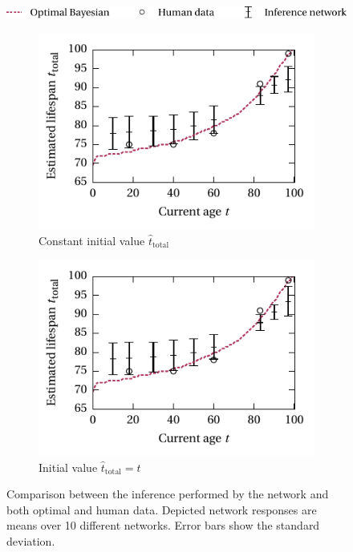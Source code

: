 \documentclass[a4paper,11pt]{article}
\begin{document}
\begin{figure}
	\centering%
	\includegraphics{media/net_lifespan_analysis_legend.pdf}\\[0.25cm]%
	\begin{subfigure}{0.5\textwidth}%
		\centering
		\includegraphics{media/net_lifespan_gaussian_10_const_analysis.pdf}%
		\caption{Constant initial value $\hat t_\mathrm{total}$}%
	\end{subfigure}%
	\begin{subfigure}{0.5\textwidth}%
		\centering%
		\includegraphics{media/net_lifespan_gaussian_10_t_analysis.pdf}%
		\caption{Initial value $\hat t_\mathrm{total} = t$}%
	\end{subfigure}%
	\caption{Comparison between the inference performed by the network and both optimal and human data. Depicted network responses are means over 10 different networks. Error bars show the standard deviation.}
	\label{fig:net_lifespan_analysis}
\end{figure}
\end{document}
